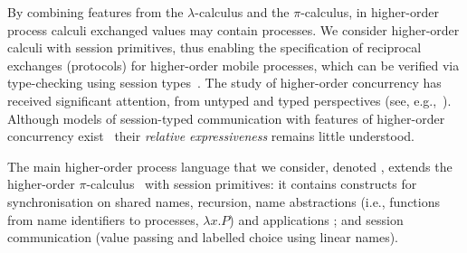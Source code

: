 By combining features from the $\lambda$-calculus and the $\pi$-calculus, 
in {higher-order process calculi} exchanged values may contain  processes. 
We consider higher-order calculi with {session primitives},
thus enabling the specification of reciprocal exchanges (protocols) 
for higher-order mobile processes, 
which can be verified via type-checking using {session types}~\cite{honda.vasconcelos.kubo:language-primitives}.
The study of higher-order concurrency has received significant attention, 
from untyped and typed perspectives (see, e.g.,~\cite{ThomsenB:plachoasgcfhop,SangiorgiD:expmpa,San96int,MostrousY15,DBLP:journals/iandc/LanesePSS11,DBLP:conf/icalp/LanesePSS10,DBLP:conf/esop/KoutavasH11,XuActa2012}).
Although models of session-typed 
communication with features of higher-order concurrency exist~\cite{tlca07,DBLP:journals/jfp/GayV10}
their \emph{relative expressiveness}
remains little understood. 

The main higher-order process language that we consider, denoted \HOp,
extends the higher-order $\pi$-calculus~\cite{SangiorgiD:expmpa} with session primitives:
it contains constructs for 
synchronisation on shared names, 
recursion, 
name abstractions (i.e., functions from name identifiers  to processes, 
$\lambda x.P$) and applications 
;
and session communication (value passing and
labelled choice using linear names). 

